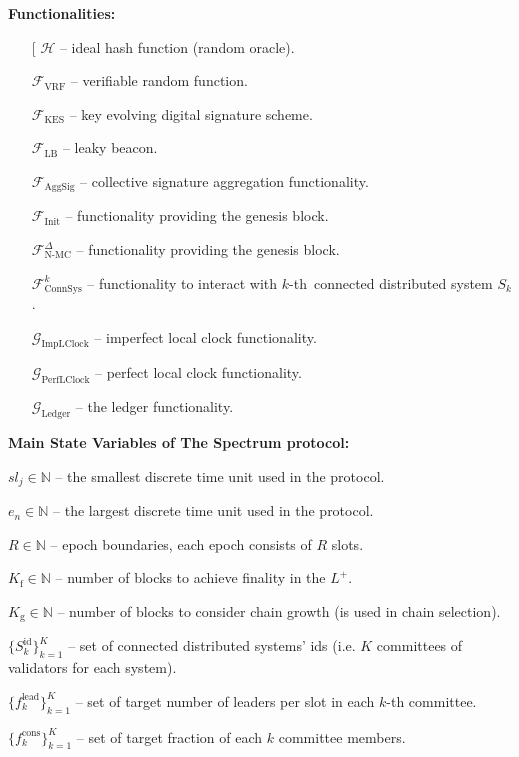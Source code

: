 \textbf{Functionalities:}
\begin{itemize}
    \item[\fontencoding[\ding{113}] $\mathcal{H}$ -- ideal hash function (random oracle).
    \item[\ding{113}] $\mathcal{F}_{\text{VRF}}$ -- verifiable random function.
    \item[\ding{113}] $\mathcal{F}_{\text{KES}}$ -- key evolving digital signature scheme.
    \item[\ding{113}] $\mathcal{F}_{\text{LB}}$ -- leaky beacon.
    \item[\ding{113}] $\mathcal{F}_{\text{AggSig}}$ -- collective signature aggregation functionality.
    \item[\ding{113}] $\mathcal{F}_{\text{Init}}$ -- functionality providing the genesis block.
    \item[\ding{113}] $\mathcal{F}^{\Delta}_{\text{N-MC}}$ -- functionality providing the genesis block.
    \item[\ding{113}] $\mathcal{F}^k_{\text{ConnSys}}$ -- functionality to interact with $k$-th\
    connected distributed system $S_k$.
    \item[\ding{113}] $\mathcal{G}_{\text{ImpLClock}}$ -- imperfect local clock functionality.
    \item[\ding{113}] $\mathcal{G}_{\text{PerfLClock}}$ -- perfect local clock functionality.
    \item[\ding{113}] $\mathcal{G}_{\text{Ledger}}$ -- the ledger functionality.

\end{itemize}
\bigbreak

\noindent
\textbf{Main State Variables of The Spectrum protocol:}
\begin{legal}
    \item[\ding{113}] $sl_j \in \mathbb{N}$ -- the smallest discrete time unit used in the protocol.
    \item[\ding{113}] $e_n \in \mathbb{N}$ -- the largest discrete time unit used in the protocol.
    \item[\ding{113}] $R \in \mathbb{N}$ -- epoch boundaries, each epoch consists of $R$ slots.
    \item[\ding{113}] $K_{\text{f}} \in \mathbb{N}$ -- number of blocks to achieve finality in the $L^+$.
    \item[\ding{113}] $K_{\text{g}} \in \mathbb{N}$ -- number of blocks to consider chain growth (is used in chain selection).
    \item[\ding{113}] $\{S_k^{\text{id}}\}_{k=1}^K$ -- set of connected distributed systems' ids (i.e. $K$ committees of validators for each system).
    \item[\ding{113}] $\{f^{\text{lead}}_k\}_{k=1}^K$ -- set of target number of leaders per slot in each $k$-th committee.
    \item[\ding{113}] $\{f^{\text{cons}}_k\}_{k=1}^K$ -- set of target fraction of each $k$ committee members.
\end{legal}
\bigbreak

